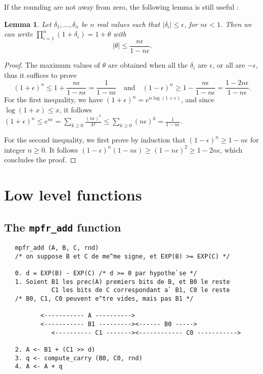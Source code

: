 \documentclass[12pt]{amsart}
\newtheorem{lemma}{Lemma}
\begin{document}
If the rounding are not away from zero, the following lemma is still useful
\cite{Graillat05}:
\begin{lemma} \label{lemma_graillat}
Let $\delta_1, \ldots, \delta_n$ be $n$ real values such that
$|\delta_i| \leq \epsilon$, for $n \epsilon < 1$.
Then we can write $\prod_{i=1}^n (1+\delta_i)
= 1 + \theta$ with
\[ |\theta| \leq \frac{n \epsilon}{1 - n \epsilon}. \]
\end{lemma}
\begin{proof}
The maximum values of $\theta$ are obtained when all the $\delta_i$ are
$\epsilon$, or all are $-\epsilon$, thus it suffices to prove
\[ (1+\epsilon)^n \leq 1 + \frac{n \epsilon}{1 - n \epsilon}
   = \frac{1}{1 - n \epsilon}
   \quad \mbox{and} \quad
   (1-\epsilon)^n \geq 1 - \frac{n \epsilon}{1 - n \epsilon}
   = \frac{1 - 2 n \epsilon}{1 - n \epsilon}. \]
For the first inequality, we have $(1+\epsilon)^n = e^{n \log(1+\epsilon)}$,
and since $\log(1+x) \leq x$, it follows $(1+\epsilon)^n \leq e^{n \epsilon}
= \sum_{k \geq 0} \frac{(n \epsilon)^k}{k!} \leq \sum_{k \geq 0}
 (n \epsilon)^k = \frac{1}{1 - n \epsilon}$.

For the second inequality, we first prove by induction that $(1-\epsilon)^n
\geq 1 - n \epsilon$ for integer $n \geq 0$.
It follows $(1-\epsilon)^n (1 - n \epsilon) \geq (1 - n \epsilon)^2 \geq
1 - 2 n \epsilon$, which concludes the proof.
\end{proof}

\section{Low level functions}

\subsection{The {\tt mpfr\_add} function}

\begin{verbatim}
   mpfr_add (A, B, C, rnd)
   /* on suppose B et C de me^me signe, et EXP(B) >= EXP(C) */

   0. d = EXP(B) - EXP(C) /* d >= 0 par hypothe`se */
   1. Soient B1 les prec(A) premiers bits de B, et B0 le reste
             C1 les bits de C correspondant a` B1, C0 le reste
   /* B0, C1, C0 peuvent e^tre vides, mais pas B1 */

          <----------- A ---------->
          <----------- B1 ---------><------ B0 ----->
             <---------- C1 -------><------------ C0 ----------->

   2. A <- B1 + (C1 >> d)
   3. q <- compute_carry (B0, C0, rnd)
   4. A <- A + q
\end{verbatim}
\end{document}
